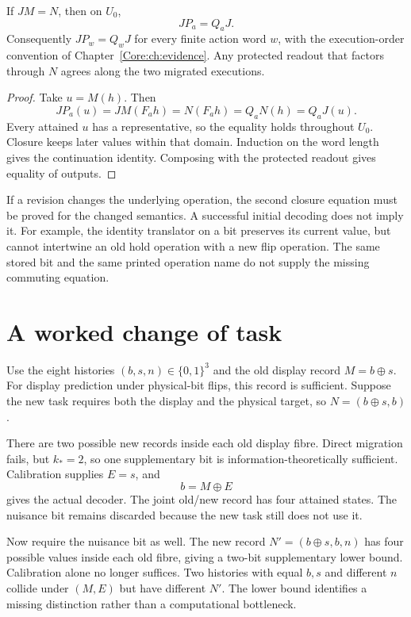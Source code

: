\begin{Coretheorem}\label{Core:r:migration-operations}
If $JM=N$, then on $U_0$,
\[
 JP_a=Q_aJ.
\]
Consequently $JP_w=Q_wJ$ for every finite action word $w$, with the execution-order convention of Chapter~\ref{Core:ch:evidence}. Any protected readout that factors through $N$ agrees along the two migrated executions.
\end{Coretheorem}
\begin{proof}
Take $u=M(h)$. Then
\[
 JP_a(u)=JM(F_a h)=N(F_a h)=Q_aN(h)=Q_aJ(u).
\]
Every attained $u$ has a representative, so the equality holds throughout $U_0$. Closure keeps later values within that domain. Induction on the word length gives the continuation identity. Composing with the protected readout gives equality of outputs.
\end{proof}

If a revision changes the underlying operation, the second closure equation must be proved for the changed semantics. A successful initial decoding does not imply it. For example, the identity translator on a bit preserves its current value, but cannot intertwine an old hold operation with a new flip operation. The same stored bit and the same printed operation name do not supply the missing commuting equation.

\section{A worked change of task}
Use the eight histories $(b,s,n)\in\{0,1\}^3$ and the old display record $M=b\oplus s$. For display prediction under physical-bit flips, this record is sufficient. Suppose the new task requires both the display and the physical target, so $N=(b\oplus s,b)$.

There are two possible new records inside each old display fibre. Direct migration fails, but $k_*=2$, so one supplementary bit is information-theoretically sufficient. Calibration supplies $E=s$, and
\[
 b=M\oplus E
\]
gives the actual decoder. The joint old/new record has four attained states. The nuisance bit remains discarded because the new task still does not use it.

Now require the nuisance bit as well. The new record $N'=(b\oplus s,b,n)$ has four possible values inside each old fibre, giving a two-bit supplementary lower bound. Calibration alone no longer suffices. Two histories with equal $b,s$ and different $n$ collide under $(M,E)$ but have different $N'$. The lower bound identifies a missing distinction rather than a computational bottleneck.


